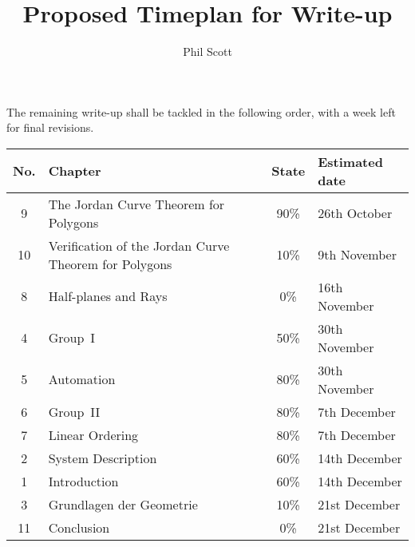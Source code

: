 \documentclass{article}
\title{Proposed Timeplan for Write-up}
\author{Phil Scott}
\begin{document}
\maketitle

The remaining write-up shall be tackled in the following order, with a week left for final revisions.
\vspace{1cm}

\begin{tabularx}{\linewidth}{c|X|c|X}
No. & Chapter & State & Estimated date\\
\hline
9 & The Jordan Curve Theorem for Polygons & 90\% & 26th October \\
10 & Verification of the Jordan Curve Theorem for Polygons & 10\% & 9th November\\
8 & Half-planes and Rays & 0\% & 16th November\\
4 & Group~I & 50\% & 30th November\\
5 & Automation & 80\% & 30th November \\
6 & Group~II & 80\% & 7th December \\
7 & Linear Ordering & 80\% & 7th December \\
2 & System Description & 60\% & 14th December \\
1 & Introduction & 60\% & 14th December\\
3 & Grundlagen der Geometrie & 10\% & 21st December\\
11 & Conclusion & 0\% & 21st December
\end{tabularx}
\end{document}
